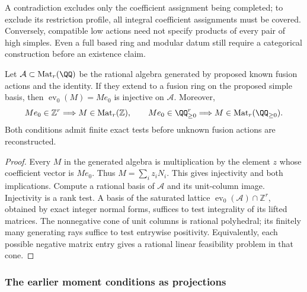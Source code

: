 A contradiction excludes only the coefficient assignment being completed;
to exclude its restriction profile, all integral coefficient assignments
must be covered. Conversely, compatible low actions need not specify
products of every pair of high simples. Even a full based ring and modular
datum still require a categorical construction before an existence claim.

\begin{corollary}
\label{cor:unit-column-saturation}
Let $\mathcal A\subset\operatorname{Mat}_r(\QQ)$ be the rational
algebra generated by proposed known fusion actions and the identity.
If they extend to a fusion ring on the proposed simple basis, then
$\operatorname{ev}_0(M)=Me_0$ is injective on $\mathcal A$.
Moreover,
\[
 Me_0\in\mathbb Z^r\Longrightarrow M\in\operatorname{Mat}_r(\mathbb Z),
 \qquad
 Me_0\in\QQ_{\ge0}^r\Longrightarrow M\in\operatorname{Mat}_r(\QQ_{\ge0}).
\]
Both conditions admit finite exact tests before unknown fusion actions
are reconstructed.
\end{corollary}
\begin{proof}
Every $M$ in the generated algebra is multiplication by the element
$z$ whose coefficient vector is $Me_0$. Thus $M=\sum_i z_iN_i$.
This gives injectivity and both implications. Compute a rational basis
of $\mathcal A$ and its unit-column image. Injectivity is a rank test.
A basis of the saturated lattice
$\operatorname{ev}_0(\mathcal A)\cap\mathbb Z^r$, obtained by exact
integer normal forms, suffices to test integrality of its lifted
matrices. The nonnegative cone of unit columns is rational polyhedral;
its finitely many generating rays suffice to test entrywise positivity.
Equivalently, each possible negative matrix entry gives a rational
linear feasibility problem in that cone.
\end{proof}

\subsubsection{The earlier moment conditions as projections}

